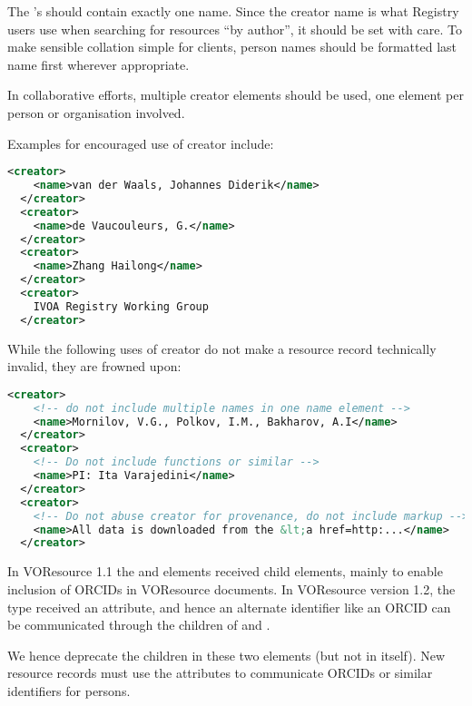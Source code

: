 \documentclass[11pt,a4paper]{ivoa}
\begin{document}

The 's  should contain exactly one name.
Since the creator name is what Registry users use when searching for
resources ``by author'', it should be set with care.  To make sensible
collation simple for clients, person names should be formatted last name
first wherever appropriate.

In collaborative efforts, multiple creator elements should be used, one
element per person or organisation involved.

Examples for encouraged use of creator include:

\begin{lstlisting}[language=XML,basicstyle=\footnotesize]
  <creator>
    <name>van der Waals, Johannes Diderik</name>
  </creator>
  <creator>
    <name>de Vaucouleurs, G.</name>
  </creator>
  <creator>
    <name>Zhang Hailong</name>
  </creator>
  <creator>
    IVOA Registry Working Group
  </creator>
\end{lstlisting}

While the following uses of creator do not make a resource record
technically invalid, they are frowned upon:

\begin{lstlisting}[language=XML,basicstyle=\footnotesize]
  <creator>
    <!-- do not include multiple names in one name element -->
    <name>Mornilov, V.G., Polkov, I.M., Bakharov, A.I</name>
  </creator>
  <creator>
    <!-- Do not include functions or similar -->
    <name>PI: Ita Varajedini</name>
  </creator>
  <creator>
    <!-- Do not abuse creator for provenance, do not include markup -->
    <name>All data is downloaded from the &lt;a href=http:...</name>
  </creator>
\end{lstlisting}

In VOResource 1.1 the  and  elements
received  child elements, mainly to enable
inclusion of ORCIDs in VOResource documents.  In VOResource
version 1.2, the  type received an
 attribute, and hence an alternate identifier like
an ORCID can be communicated through the  children of
 and .

We hence deprecate the  children in these two
elements (but not in  itself).  New resource records
must use the  attributes to communicate
ORCIDs or similar identifiers for persons.
\end{document}
